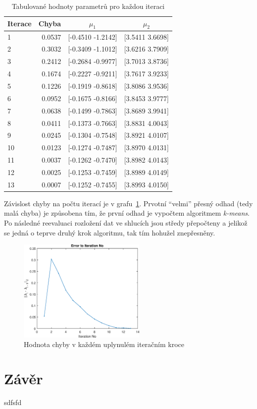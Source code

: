 \begin{table}[htb]
    \centering

    \begin{tabular}{lrcc}
        \toprule

        Iterace & Chyba     & \( \mu_1 \)       & \( \mu_2 \)       \\ \midrule
        1       & 0.0537    & [-0.4510 -1.2142] & [3.5411 3.6698]   \\
        2       & 0.3032    & [-0.3409 -1.1012] & [3.6216 3.7909]   \\
        3       & 0.2412    & [-0.2684 -0.9977] & [3.7013 3.8736]   \\
        4       & 0.1674    & [-0.2227 -0.9211] & [3.7617 3.9233]   \\
        5       & 0.1226    & [-0.1919 -0.8618] & [3.8086 3.9536]   \\
        6       & 0.0952    & [-0.1675 -0.8166] & [3.8453 3.9777]   \\
        7       & 0.0638    & [-0.1499 -0.7863] & [3.8689 3.9941]   \\
        8       & 0.0411    & [-0.1373 -0.7663] & [3.8831 4.0043]   \\
        9       & 0.0245    & [-0.1304 -0.7548] & [3.8921 4.0107]   \\
        10      & 0.0123    & [-0.1274 -0.7487] & [3.8970 4.0131]   \\
        11      & 0.0037    & [-0.1262 -0.7470] & [3.8982 4.0143]   \\
        12      & 0.0025    & [-0.1253 -0.7459] & [3.8989 4.0149]   \\
        13      & 0.0007    & [-0.1252 -0.7455] & [3.8993 4.0150]   \\
          
        \bottomrule
    \end{tabular}

    \caption{Tabulované hodnoty parametrů pro každou iteraci}
    \label{table:table1}
\end{table}
\FloatBarrier

Závislost chyby na počtu iterací je v grafu~\ref{fig:result4}.
Prvotní \enquote{velmi} přesný odhad (tedy malá chyba) je způsobena tím, že první odhad je vypočtem algoritmem \textit{k-means}.
Po následné reevaluaci rozložení dat ve shlucích jsou středy přepočteny a jelikož se jedná o teprve druhý krok algoritmu, tak tím hohužel znepřesněny.

\begin{figure}[htb]
    \centering
    \includegraphics[width=0.55\textwidth]{graphs/fig4.eps}
    \caption{Hodnota chyby v každém uplynulém iteračním kroce}
    \label{fig:result4}
\end{figure}
\FloatBarrier

\section{Závěr}

sdfsfd
